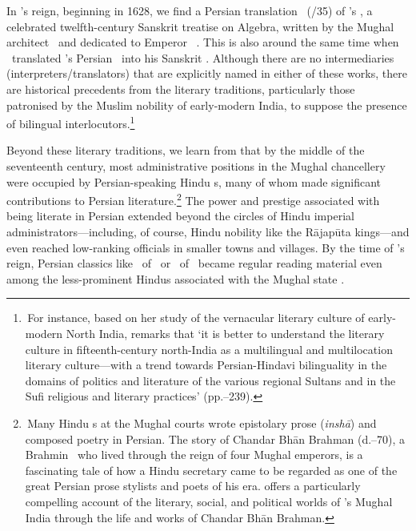 In \Shahjahan's reign, beginning in 1628, we find a Persian translation \TarjumayiBijganit\ (/35) of \BhaskaraII's  \Bijaganita, a celebrated twelfth-century Sanskrit treatise on Algebra, written by the Mughal architect \AtaAllahRushdi\ and dedicated to Emperor \Shahjahan\ \parencite[384--386]{Ansaribhaskara}. This is also around the same time when \Nityananda\ translated \MullaFarid's Persian \ZijiShahJahani\ into his Sanskrit \Siddhantasindhu. Although there are no intermediaries (interpreters/translators) that are explicitly named in either of these works, there are historical precedents from the literary traditions, particularly those patronised by the Muslim nobility of early-modern India, to suppose the presence of bilingual interlocutors.\footnote{\,For instance, based on her study of the vernacular literary culture of early-modern North India, \textcite{Orsini} remarks that `it is better to understand the literary culture in fifteenth-century north-India as a multilingual and multilocation literary culture---with a trend towards Persian-Hindavi bilinguality in the domains of politics and literature of the various regional Sultans and in the Sufi religious and literary practices' (pp.--239).} 

Beyond these literary traditions, we learn from \textcite[327--328]{AlamPersian1998} that
by the middle of the seventeenth century, most administrative positions in the Mughal chancellery were occupied by Persian-speaking Hindu \munshi s, many of whom made significant contributions to Persian literature.\footnote{\,Many Hindu \munshi s at the Mughal courts wrote epistolary prose (\textit{inshā}) and composed poetry in Persian. The story of Chandar Bhān Brahman (d.\thinspace {}--70), a Brahmin \munshi\ who lived through the reign of four Mughal emperors, is a fascinating tale of how a Hindu secretary came to be regarded as one of the great Persian prose stylists and poets of his era. \textcite{Kinra} offers a particularly compelling account of the literary, social, and political worlds of \Shahjahan's Mughal India through the life and works of Chandar Bhān Brahman.} %
The power and prestige associated with being literate in Persian extended beyond the circles of Hindu imperial administrators---including, of course, Hindu nobility like the Rājapūta kings---and even reached low-ranking officials in smaller towns and villages. By the time of \Shahjahan's reign, Persian classics like \AkhlaqiNasiri\ of \alTusifull\ or \MasnaviyiManavi\ of \Rumipoet\ became regular reading material even among the less-prominent Hindus associated with the Mughal state \parencite[328]{AlamPersian1998}. 

